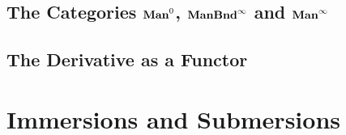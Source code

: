 \documentclass{book}
\begin{document}
	\section{The Categories $\Man0$, $\operatorname*{\text{\textbf{ManBnd}}^{\infty}}$ and $\operatorname*{\text{\textbf{Man}}^{\infty}}$}
	
	
	
	
	
	
	
	
	
	
	
	
	
	
	
	
	
	
	
	
	
	
	
	
	
	
	
	
	
	
	
	
	
	
	
	
	
	
	
	
	
	
	
	
	\section{The Derivative as a Functor}
	
	
	
	
	
	
	
	
	
	
	
	
	
	
	
	
	
	
	
	
	
	
	
	
	
	
	
	
	
	
	
	
	
	
	
	
	
	
	
	
	
	
	
	
	
	
	
	
	
	\newpage
	\chapter{Immersions and Submersions}
	
\end{document}
